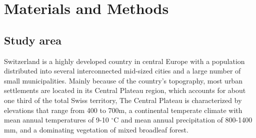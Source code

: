 \documentclass[10pt,letterpaper]{article}
\begin{document}
\section*{Materials and Methods}

\subsection*{Study area}

Switzerland is a highly developed country in central Europe %
with a population distributed into several interconnected mid-sized cities and a large number of small municipalities.
Mainly because of the country's topography, most urban settlements are located in its Central Plateau region, which accounts for about one third of the total Swiss territory, %
The Central Plateau is characterized by elevations that range from 400 to 700m, a continental temperate climate with mean annual temperatures of 9-10 $^{\circ}$C and mean annual precipitation of 800-1400 mm, and a dominating vegetation of mixed broadleaf forest.
\end{document}
